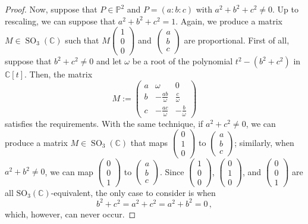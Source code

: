 \documentclass[a4paper, 11pt, reqno]{amsart}
\theoremstyle{plain}
\theoremstyle{definition}
\newcommand{\C}{\mathbb{C}}
\newcommand{\p}{\mathbb{P}}
\newcommand{\SO}{\operatorname{SO}}
\begin{document}
\begin{proof}
Now, suppose that $P \in \p^2$ and $P = (a:b:c)$ with $a^2 + b^2 + c^2 \neq 0$.
Up to rescaling, we can suppose that $a^2 + b^2 + c^2 = 1$.
Again, we produce a matrix $M \in \SO_3(\C)$ such that $M \left(\begin{smallmatrix} 1 \\ 0 \\ 0 \end{smallmatrix}\right)$ and~$\left(\begin{smallmatrix} a \\ b \\ c \end{smallmatrix}\right)$ are proportional.
First of all, suppose that $b^2 + c^2 \neq 0$ and let $\omega$ be a root of the polynomial $t^2 - (b^2 + c^2)$ in $\C[t]$.
Then, the matrix
%
\[
  M :=
  \begin{pmatrix}
    a & \omega & 0 \\
    b & -\frac{ab}{\omega} & \frac{c}{\omega} \\
    c & -\frac{ac}{\omega} & -\frac{b}{\omega}
  \end{pmatrix}
\]
%
satisfies the requirements.
With the same technique, if $a^2 + c^2 \neq 0$, we can produce a matrix $M \in \SO_3(\C)$ that maps $\left(\begin{smallmatrix} 0 \\ 1 \\ 0 \end{smallmatrix}\right)$ to $\left(\begin{smallmatrix} a \\ b \\ c \end{smallmatrix}\right)$; similarly, when $a^2 + b^2 \neq 0$, we can map $\left(\begin{smallmatrix} 0 \\ 0 \\ 1 \end{smallmatrix}\right)$ to $\left(\begin{smallmatrix} a \\ b \\ c \end{smallmatrix}\right)$.
Since $\left(\begin{smallmatrix} 1 \\ 0 \\ 0 \end{smallmatrix}\right)$, $\left(\begin{smallmatrix} 0 \\ 1 \\ 0 \end{smallmatrix}\right)$, and $\left(\begin{smallmatrix} 0 \\ 0 \\ 1 \end{smallmatrix}\right)$ are all $\mathrm{SO}_3(\C)$-equivalent, the only case to consider is when
%
\[
  b^2 + c^2 = a^2 + c^2 = a^2 + b^2 = 0 \,,
\]
%
which, however, can never occur.
\end{proof}
\end{document}
